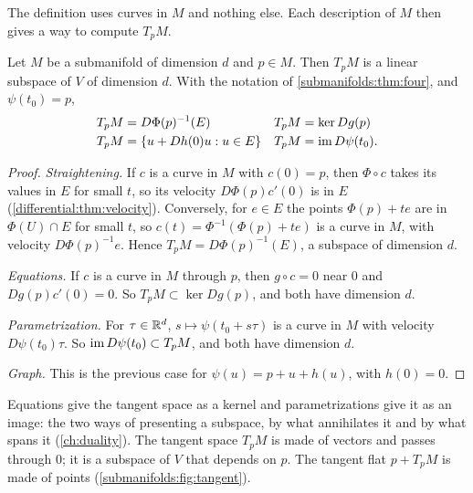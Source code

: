 \begin{notechapter}
The definition uses curves in $M$ and nothing else. Each description of
$M$ then gives a way to compute $T_pM$.

\begin{theorem}\label{submanifolds:thm:tangent}
Let $M$ be a submanifold of dimension $d$ and $p\in M$. Then $T_pM$ is a
linear subspace of $V$ of dimension $d$. With the notation of
\cref{submanifolds:thm:four}, and $\psi(t_0) = p$,
\begin{align*}
  T_pM &= D\Phi(p)^{-1}(E)
       & T_pM &= \ker Dg(p) \\
  T_pM &= \{u + Dh(0)u : u\in E\}
       & T_pM &= \operatorname{im} D\psi(t_0) .
\end{align*}
\end{theorem}

\begin{proof}
\emph{Straightening.} If $c$ is a curve in $M$ with $c(0) = p$, then
$\Phi\circ c$ takes its values in $E$ for small $t$, so its velocity
$D\Phi(p)c'(0)$ is in $E$ (\cref{differential:thm:velocity}). Conversely,
for $e\in E$ the points $\Phi(p) + te$ are in $\Phi(U)\cap E$ for small
$t$, so $c(t) = \Phi^{-1}(\Phi(p) + te)$ is a curve in $M$, with velocity
$D\Phi(p)^{-1}e$. Hence $T_pM = D\Phi(p)^{-1}(E)$, a subspace of
dimension $d$.

\emph{Equations.} If $c$ is a curve in $M$ through $p$, then
$g\circ c = 0$ near $0$ and $Dg(p)c'(0) = 0$. So
$T_pM\subset\ker Dg(p)$, and both have dimension $d$.

\emph{Parametrization.} For $\tau\in\mathbb{R}^d$, $s\mapsto\psi(t_0 + s\tau)$ is
a curve in $M$ with velocity $D\psi(t_0)\tau$. So
$\operatorname{im} D\psi(t_0)\subset T_pM$, and both have dimension $d$.

\emph{Graph.} This is the previous case for $\psi(u) = p + u + h(u)$,
with $h(0) = 0$.
\end{proof}

\begin{keyidea}
Equations give the tangent space as a kernel and parametrizations give it
as an image: the two ways of presenting a subspace, by what annihilates
it and by what spans it (\cref{ch:duality}). The tangent space $T_pM$ is
made of vectors and passes through $0$; it is a subspace of $V$ that
depends on $p$. The tangent flat $p + T_pM$ is made of points
(\cref{submanifolds:fig:tangent}).
\end{keyidea}


\end{notechapter}
